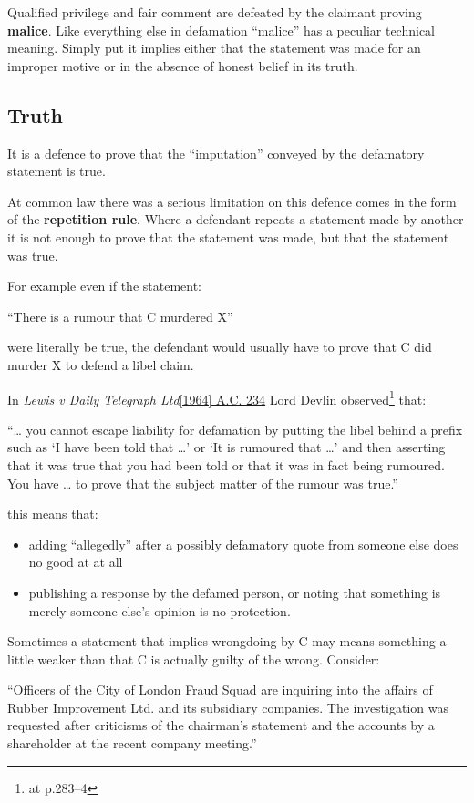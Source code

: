 \documentclass[]{article}
\begin{document}
{{Qualified privilege and fair comment are defeated by the claimant
proving }}{\textbf{malice}}{{. Like everything else in defamation
``malice'' has a peculiar technical meaning. Simply put it implies
either that the statement was made for an improper motive or in the
absence of honest belief in its truth.}}

\subsection{Truth}

It is a defence to prove that the ``imputation'' conveyed by the defamatory statement is true.

At common law there was a serious limitation on this defence comes in the form of the {\bf repetition rule}. Where a defendant repeats a statement
made by another it is not enough to prove that the statement was made, but that the statement was true. 

For example even if the statement:

``There is a rumour that C murdered X''

were literally be true, the defendant would usually have to prove that C did murder X to defend a libel claim.

In {\it Lewis v Daily Telegraph Ltd}\href{}{[1964] A.C. 234} Lord Devlin observed\footnote{at p.283--4 } that:

``\ldots{} you cannot escape liability for defamation by putting the
libel behind a prefix such as `I have been told that \ldots{}' or `It is
rumoured that \ldots{}' and then asserting that it was true that you had
been told or that it was in fact being rumoured. You have \ldots{} to
prove that the subject matter of the rumour was true.''

this means that:

\begin{itemize}
\item
  adding ``allegedly'' after a possibly defamatory quote from someone
  else does no good at at all
\item
  publishing a response by the defamed person, or noting that something
  is merely someone else's opinion is no protection.
\end{itemize}

Sometimes a statement that implies wrongdoing by C may means something a little weaker than that C is actually guilty of the wrong. Consider:

``Officers of the City of London Fraud Squad are inquiring into the
affairs of Rubber Improvement Ltd. and its subsidiary companies. The
investigation was requested after criticisms of the chairman's statement
and the accounts by a shareholder at the recent company meeting.''
\end{document}
